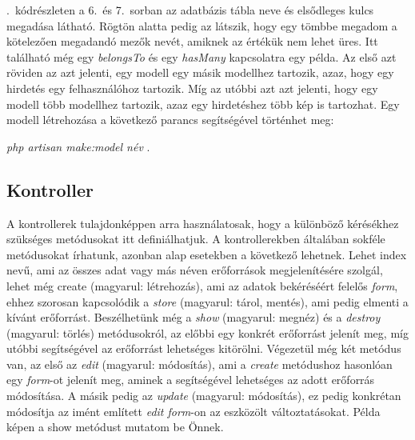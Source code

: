 \documentclass[]{thesis-ekf}
\theoremstyle{definition}
\theoremstyle{remark}
\begin{document}
		
		
		.~kódrészleten a 6.~és 7.~sorban az adatbázis tábla neve és elsődleges kulcs megadása látható. Rögtön alatta pedig az látszik, hogy egy tömbbe megadom a kötelezően megadandó mezők nevét, amiknek az értékük nem lehet üres. Itt található még egy \emph{belongsTo} és egy \emph{hasMany} kapcsolatra egy példa. Az első azt röviden az azt jelenti, egy modell egy másik modellhez tartozik, azaz, hogy egy hirdetés egy felhasználóhoz tartozik. Míg az utóbbi azt azt jelenti, hogy egy modell több modellhez tartozik, azaz egy hirdetéshez több kép is tartozhat. Egy modell létrehozása a következő parancs segítségével történhet meg:
		\begin{center} 
			\emph{php artisan make:model név} .
		\end{center}
	
	\subsection{Kontroller}\label{sc-kontroller}
		A kontrollerek tulajdonképpen arra használatosak, hogy a különböző kérésékhez szükséges metódusokat itt definiálhatjuk. A kontrollerekben általában sokféle metódusokat írhatunk, azonban alap esetekben a következő lehetnek. Lehet index nevű, ami az összes adat vagy más néven erőforrások megjelenítésére szolgál, lehet még create (magyarul: létrehozás), ami az adatok bekéréséért felelős \emph{form}, ehhez szorosan kapcsolódik a \emph{store} (magyarul: tárol, mentés), ami pedig elmenti a kívánt erőforrást. Beszélhetünk még a \emph{show} (magyarul: megnéz) és a \emph{destroy} (magyarul: törlés) metódusokról, az előbbi egy konkrét erőforrást jelenít meg, míg utóbbi segítségével az erőforrást lehetséges kitörölni. Végezetül még két metódus van, az első az \emph{edit} (magyarul: módosítás), ami a \emph{create} metódushoz hasonlóan egy \emph{form}-ot jelenít meg, aminek a segítségével lehetséges az adott erőforrás módosítása. A másik pedig az \emph{update} (magyarul: módosítás), ez pedig konkrétan módosítja az imént említett \emph{edit form}-on az eszközölt változtatásokat. Példa képen a show metódust mutatom be Önnek. \cite{Laravel}
	
		
	
\end{document}
